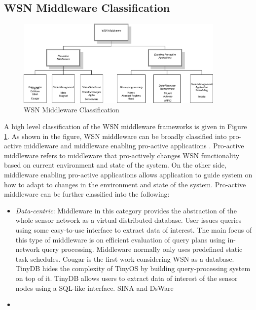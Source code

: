 \subsection{WSN Middleware Classification}
\begin{figure}[tbp]
\centerline{\includegraphics[width=4in]{figures/middleware-classification.eps}}
\caption{WSN Middleware Classification}
\label{fig:middleware-classification}
\end{figure}
A high level classification of the WSN 
middleware frameworks is given in Figure
\ref{fig:middleware-classification}. As
shown in the figure, WSN middleware can be
broadly classified into pro-active middleware
and middleware enabling pro-active applications
\cite{Heinzelman04}. Pro-active middleware refers
to middleware that pro-actively changes WSN
functionality based on current environment and
state of the system. On the other side,
middleware enabling pro-active applications
allows application to guide system on how to
adapt to changes in the environment and state of
the system. 
Pro-active middleware can be further classified
into the following:
\begin{itemize}
  \item \emph{Data-centric}: Middleware in this category provides the abstraction of the
  whole sensor network as a virtual
  distributed database. User issues queries using
  some easy-to-use interface to extract data of
  interest. The main focus of this type
  of middleware is on efficient evaluation of
  query plans using in-network query processing.
  Middleware normally only uses predefined
  static task schedules. Cougar \cite{Yao02} is
  the first work considering WSN as a
  database. TinyDB \cite{Madden02} hides the
  complexity of TinyOS by building
  query-processing system on top of it.
  TinyDB allows users to extract data of interest
  of the sensor nodes using a SQL-like interface.
  SINA\cite{Srisathapornphat01} and DsWare\cite{Son03}
  \item  
\end{itemize}

